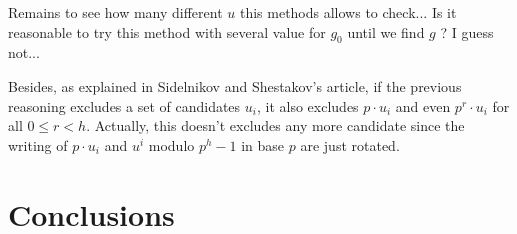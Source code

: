 \documentclass[12pt,a4paper,titlepage]{article}
\begin{document}
Remains to see how many different $u$ this methods allows to check... Is it reasonable to try this method with several value for $g_0$ until we find $g$ ? I guess not...

Besides, as explained in Sidelnikov and Shestakov's article, if the previous reasoning excludes a set of candidates $u_i$, it also excludes $p \cdot u_i$ and even $p^r \cdot u_i$ for all $0 \leq r < h$. Actually, this doesn't excludes any more candidate since the writing of $p\cdot u_i$ and $u^i$ modulo $p^h-1$ in base $p$ are just rotated.



\section{Conclusions}






\newpage
\appendix
\end{document}
